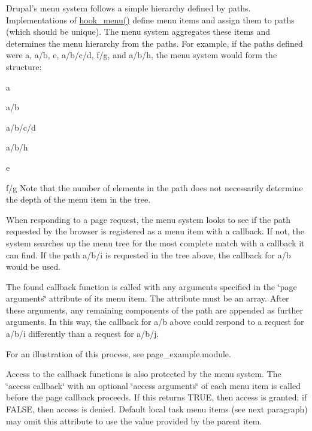 Drupal's menu system follows a simple hierarchy defined by paths. Implementations of \hyperlink{group__hooks_ga5c95244fea59b25666e409759e133ded}{hook\_\-menu()} define menu items and assign them to paths (which should be unique). The menu system aggregates these items and determines the menu hierarchy from the paths. For example, if the paths defined were a, a/b, e, a/b/c/d, f/g, and a/b/h, the menu system would form the structure:
\begin{DoxyItemize}
\item a
\begin{DoxyItemize}
\item a/b
\begin{DoxyItemize}
\item a/b/c/d
\item a/b/h
\end{DoxyItemize}
\end{DoxyItemize}
\item e
\item f/g Note that the number of elements in the path does not necessarily determine the depth of the menu item in the tree.
\end{DoxyItemize}

When responding to a page request, the menu system looks to see if the path requested by the browser is registered as a menu item with a callback. If not, the system searches up the menu tree for the most complete match with a callback it can find. If the path a/b/i is requested in the tree above, the callback for a/b would be used.

The found callback function is called with any arguments specified in the \char`\"{}page arguments\char`\"{} attribute of its menu item. The attribute must be an array. After these arguments, any remaining components of the path are appended as further arguments. In this way, the callback for a/b above could respond to a request for a/b/i differently than a request for a/b/j.

For an illustration of this process, see page\_\-example.module.

Access to the callback functions is also protected by the menu system. The \char`\"{}access callback\char`\"{} with an optional \char`\"{}access arguments\char`\"{} of each menu item is called before the page callback proceeds. If this returns TRUE, then access is granted; if FALSE, then access is denied. Default local task menu items (see next paragraph) may omit this attribute to use the value provided by the parent item.

